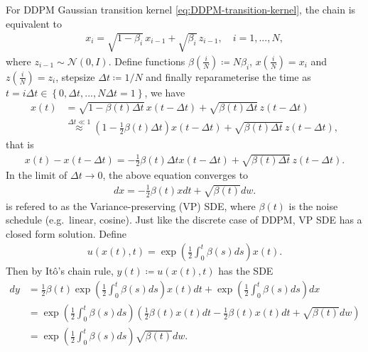 \documentclass[a4paper,12pt]{article}
\begin{document}
For DDPM Gaussian transition kernel \cref{eq:DDPM-transition-kernel}, the chain is equivalent to
\begin{align*}
    x_{i}=\sqrt{1-\beta_{i}}\,x_{i-1}+\sqrt{\beta_{i}}\,z_{i-1},\quad i=1,...,N,
\end{align*}
where \(z_{i-1}\sim \mathcal{N}\!\left(0,I\right)\). Define functions \(\beta\!\left(\frac{i}{N}\right)\coloneq N\beta_i\), \(x\!\left(\frac{i}{N}\right)=x_i\) and \(z\left(\frac{i}{N}\right)=z_i\), stepsize \(\Delta t\coloneq 1/N\) and finally reparameterise the time as \(t=i\Delta t\in\left\{0,\Delta t,...,N\Delta t=1\right\}\), we have
\begin{align*}
    x\!\left(t\right)
    &=\sqrt{1-\beta\!\left(t\right)\Delta t}\,x\!\left(t-\Delta t\right)+\sqrt{\beta\!\left(t\right)\Delta t}\,z\left(t-\Delta t\right)\\
    &\overset{\Delta t\ll 1}{\approx}\left(1-\frac{1}{2}\beta\!\left(t\right)\Delta t\right)x\!\left(t-\Delta t\right)+\sqrt{\beta\!\left(t\right)\Delta t}\,z\left(t-\Delta t\right),
\end{align*}
that is
\begin{align*}
    x\!\left(t\right)-x\!\left(t-\Delta t\right)=-\frac{1}{2}\beta\!\left(t\right)\Delta t x\!\left(t-\Delta t\right)+\sqrt{\beta\!\left(t\right)\Delta t}\,z\left(t-\Delta t\right).
\end{align*}
In the limit of \(\Delta t\to0\), the above equation converges to
\begin{align}\label{eq:VPSDE}
    dx=-\frac{1}{2}\beta\!\left(t\right)xdt+\sqrt{\beta\!\left(t\right)}dw.
\end{align}
 is refered to as the Variance-preserving (VP) SDE, where \(\beta(t)\) is the noise schedule (e.g.~linear, cosine). Just like the discrete case of DDPM, VP SDE has a closed form solution. Define
\begin{align*}
    u\left(x\!\left(t\right),t\right)=\exp\left(\frac{1}{2}\int_0^t\beta\!\left(s\right)ds\right)x\!\left(t\right).
\end{align*}
Then by It\^{o}'s chain rule, \(y\left(t\right)\coloneq u\left(x\!\left(t\right),t\right)\) has the SDE
\begin{align*}
    dy
    &=\frac{1}{2}\beta\!\left(t\right)\exp\left(\frac{1}{2}\int_0^t\beta\!\left(s\right)ds\right)x\!\left(t\right)dt+\exp\left(\frac{1}{2}\int_0^t\beta\!\left(s\right)ds\right)dx\\
    &=\exp\left(\frac{1}{2}\int_0^t\beta\!\left(s\right)ds\right)\left(\frac{1}{2}\beta\!\left(t\right)x\!\left(t\right)dt-\frac{1}{2}\beta\!\left(t\right)x\!\left(t\right)dt+\sqrt{\beta\!\left(t\right)}dw\right)\\
    &=\exp\left(\frac{1}{2}\int_0^t\beta\!\left(s\right)ds\right)\sqrt{\beta\!\left(t\right)}dw.
\end{align*}
\end{document}
